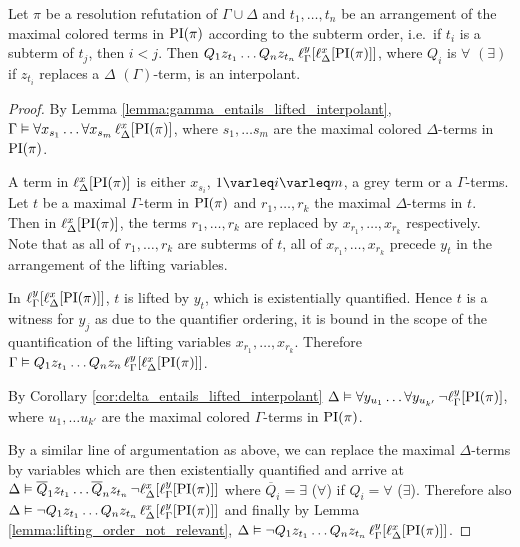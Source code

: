 \begin{thm}
	\label{thm:two_phases}
	Let $\pi$ be a resolution refutation of $\Gamma \cup \Delta$ and
	$t_1, \dots, t_n$ be an arrangement of the maximal colored terms in $\PI(\pi)$ according to the subterm order, i.e.\ if $t_i$ is a subterm of $t_j$, then $i<j$.
	Then
	$Q_1 z_{t_1} \ldots Q_n z_{t_n}\,\lifgamma{\lifdelta{\PI(\pi)}}$, where $Q_i$ is $\forall$ $(\exists)$ if $z_{t_i}$ replaces a $\Delta$ $(\Gamma)$-term, is an interpolant.
\end{thm}
\begin{proof}
	By Lemma \ref{lemma:gamma_entails_lifted_interpolant}, $\Gamma \entails \forall x_{s_1} \ldots \forall x_{s_m}\,\lifdelta{\PI(\pi)}$, where $s_1, \dots s_m$ are the maximal colored $\Delta$-terms in $\PI(\pi)$.

	A term in $\lifdelta{\PI(\pi)}$ is either $x_{s_i}$, $1 \varleq i \varleq m$, a grey term or a $\Gamma$-terms.
	Let $t$ be a maximal $\Gamma$-term in $\PI(\pi)$ and ${r_1}, \dots, {r_k}$ the maximal $\Delta$-terms in\nolinebreak{} $t$.
	Then in $\lifdelta{\PI(\pi)}$, the terms ${r_1}, \dots, {r_k}$ are replaced by $x_{r_1}, \dots, x_{r_k}$ respectively.
	Note that as all of ${r_1}, \dots, {r_k}$ are subterms of $t$, all of $x_{r_1}, \dots, x_{r_k}$ precede $y_t$ in the arrangement of the lifting variables.


	In $\lifgamma{\lifdelta{\PI(\pi)}}$, $t$ is lifted by $y_t$, which is existentially quantified.
	Hence $t$ is a witness for $y_j$ as due to the quantifier ordering,
	it is bound in the scope of the quantification of the lifting variables $x_{r_1}, \dots, x_{r_k}$.
	Therefore $\Gamma \entails Q_1 z_{t_1} \ldots Q_n z_n\,\lifgamma{\lifdelta{\PI(\pi)}}$.

	By Corollary \ref{cor:delta_entails_lifted_interpolant} $\Delta \entails \forall y_{u_1} \dots \forall y_{u_{k'}}\,\lnot \lift{\Gamma}{\PI(\pi)}{y}$, where $u_1, \dots u_{k'}$ are the maximal colored $\Gamma$-terms in $\PI(\pi)$.

	By a similar line of argumentation as above, we can replace the maximal $\Delta$-\nolinebreak{}terms by variables which are then existentially quantified and arrive at
	$\Delta \entails\nolinebreak{} \overline Q_1 z_{t_1} \dots \overline Q_n z_{t_n}\,\lnot \lft{\Delta}{x}{\lft{\Gamma}{y}{\PI(\pi)}}$ where $\overline Q_i = \exists$ ($\forall$) if $Q_i = \forall$ ($\exists$).
	Therefore also
	$\Delta \entails\nolinebreak{} \lnot Q_1 z_{t_1} \dots Q_n z_{t_n}\,\lft{\Delta}{x}{\lft{\Gamma}{y}{\PI(\pi)}}$ and
	finally by Lemma \ref{lemma:lifting_order_not_relevant},
	$\Delta \entails\nolinebreak{} \lnot Q_1 z_{t_1} \dots Q_n z_{t_n}\,\lft{\Gamma}{y}{\lft{\Delta}{x}{\PI(\pi)}}$.


\end{proof}
